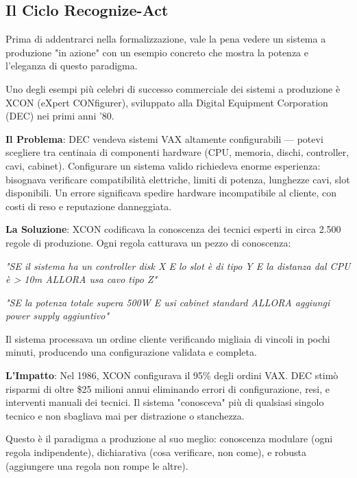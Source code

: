 \subsection{Il Ciclo Recognize-Act}

Prima di addentrarci nella formalizzazione, vale la pena vedere un sistema a produzione "in azione" con un esempio concreto che mostra la potenza e l'eleganza di questo paradigma.

\begin{successbox}
Uno degli esempi più celebri di successo commerciale dei sistemi a produzione è XCON (eXpert CONfigurer), sviluppato alla Digital Equipment Corporation (DEC) nei primi anni '80.

\textbf{Il Problema}: DEC vendeva sistemi VAX altamente configurabili — potevi scegliere tra centinaia di componenti hardware (CPU, memoria, dischi, controller, cavi, cabinet). Configurare un sistema valido richiedeva enorme esperienza: bisognava verificare compatibilità elettriche, limiti di potenza, lunghezze cavi, slot disponibili. Un errore significava spedire hardware incompatibile al cliente, con costi di reso e reputazione danneggiata.

\textbf{La Soluzione}: XCON codificava la conoscenza dei tecnici esperti in circa 2.500 regole di produzione. Ogni regola catturava un pezzo di conoscenza:

\textit{"SE il sistema ha un controller disk X E lo slot è di tipo Y E la distanza dal CPU è > 10m ALLORA usa cavo tipo Z"}

\textit{"SE la potenza totale supera 500W E usi cabinet standard ALLORA aggiungi power supply aggiuntivo"}

Il sistema processava un ordine cliente verificando migliaia di vincoli in pochi minuti, producendo una configurazione validata e completa.

\textbf{L'Impatto}: Nel 1986, XCON configurava il 95\% degli ordini VAX. DEC stimò risparmi di oltre \$25 milioni annui eliminando errori di configurazione, resi, e interventi manuali dei tecnici. Il sistema "conosceva" più di qualsiasi singolo tecnico e non sbagliava mai per distrazione o stanchezza.

Questo è il paradigma a produzione al suo meglio: conoscenza modulare (ogni regola indipendente), dichiarativa (cosa verificare, non come), e robusta (aggiungere una regola non rompe le altre).
\end{successbox}

